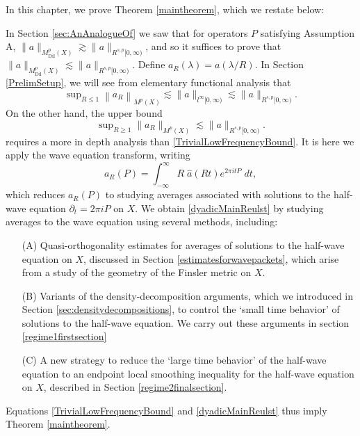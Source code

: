 
In this chapter, we prove Theorem \ref{maintheorem}, which we restate below:

\thmmaintheorem*

In Section \ref{sec:AnAnalogueOf} we saw that for operators $P$ satisfying Assumption A, $\| a \|_{M^p_{\text{Dil}}(X)} \gtrsim \| a \|_{R^{s,p}[0,\infty)}$, and so it suffices to prove that $\| a \|_{M^p_{\text{Dil}}(X)} \lesssim \| a \|_{R^{s,p}[0,\infty)}$. Define $a_R(\lambda) = a(\lambda / R)$. In Section \ref{PrelimSetup}, we will see from elementary functional analysis that
%
\begin{equation} \label{TrivialLowFrequencyBound}
    \sup\nolimits_{R \leq 1} \left\| a_R \right\|_{M^p(X)} \lesssim \| a \|_{l^\infty[0,\infty)} \lesssim \| a \|_{R^{s,p}[0,\infty)}.
\end{equation}
%
On the other hand, the upper bound
%
\begin{equation} \label{dyadicMainReulst}
    \sup\nolimits_{R \geq 1} \| a_R \|_{M^p(X)} \lesssim \| a \|_{R^{s,p}[0,\infty)}.
\end{equation}
%
requires a more in depth analysis than \eqref{TrivialLowFrequencyBound}. It is here we apply the wave equation transform, writing
%
\begin{equation}
    a_R(P) = \int_{-\infty}^\infty R\;\! \widehat{a}(Rt) e^{2 \pi i t P}\; dt,
\end{equation}
%
which reduces $a_R(P)$ to studying averages associated with solutions to the half-wave equation $\partial_t = 2 \pi i P$ on $X$. We obtain \eqref{dyadicMainReulst} by studying averages to the wave equation using several methods, including:
%
\begin{itemize}
    \item[(A)] Quasi-orthogonality estimates for averages of solutions to the half-wave equation on $X$, discussed in Section \ref{estimatesforwavepackets}, which arise from a study of the geometry of the Finsler metric on $X$.

    \item[(B)] Variants of the density-decomposition arguments, which we introduced in Section \ref{sec:densitydecompositions}, to control the `small time behavior' of solutions to the half-wave equation. We carry out these arguments in section \ref{regime1firstsection}

    \item[(C)] A new strategy to reduce the `large time behavior' of the half-wave equation to an endpoint local smoothing inequality for the half-wave equation on $X$, described in Section \ref{regime2finalsection}.
\end{itemize}
%
Equations \eqref{TrivialLowFrequencyBound} and \eqref{dyadicMainReulst} thus imply Theorem \ref{maintheorem}.

